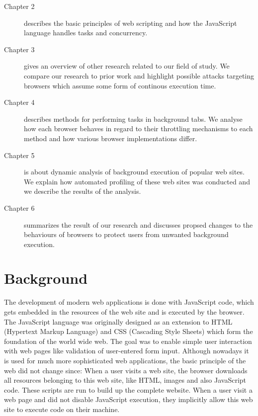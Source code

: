 \documentclass[
	ruledheaders=section,%
	class=report,%
	thesis={type=bachelor},%
	accentcolor=9c,%
	custommargins=true,%
	marginpar=false,%
	parskip=half-,%
	fontsize=11pt,%
]{tudapub}
\begin{document}
  \begin{description}
  \item[Chapter 2] describes the basic principles of web scripting and how the JavaScript language handles tasks and concurrency.
    
  \item[Chapter 3] gives an overview of other research related to our field of study. We compare our research to prior work and highlight possible attacks targeting browsers which assume some form of continous execution time.
    
  \item[Chapter 4] describes methods for performing tasks in background tabs. We analyse how each browser behaves in regard to their throttling mechanisms to each method and how various browser implementations differ.
    
  \item[Chapter 5] is about dynamic analysis of background execution of popular web sites. We explain how automated profiling of these web sites was conducted and we describe the results of the analysis.
    
  \item[Chapter 6] summarizes the result of our research and discusses propsed changes to the behaviours of browsers to protect users from unwanted background execution.
  \end{description} 

  
  \newpage
  \chapter{Background}
  
  The development of modern web applications is done with JavaScript code, which gets embedded in the resources of the web site and is executed by the browser. The JavaScript language was originally designed as an extension to HTML (Hypertext Markup Language) and CSS (Cascading Style Sheets) which form the foundation of the world wide web. The goal was to enable simple user interaction with web pages like validation of user-entered form input. Although nowadays it is used for much more sophisticated web applications, the basic principle of the web did not change since: When a user visits a web site, the browser downloads all resources belonging to this web site, like HTML, images and also JavaScript code. These scripts are run to build up the complete website. When a user visit a web page and did not disable JavaScript execution, they implicitly allow this web site to execute code on their machine.
\end{document}
